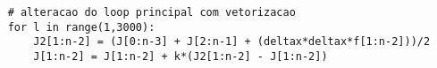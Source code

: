 \lstset{language=Python}
\begin{lstlisting}
    # alteracao do loop principal com vetorizacao
	for l in range(1,3000):
		J2[1:n-2] = (J[0:n-3] + J[2:n-1] + (deltax*deltax*f[1:n-2]))/2
		J[1:n-2] = J[1:n-2] + k*(J2[1:n-2] - J[1:n-2])
\end{lstlisting}